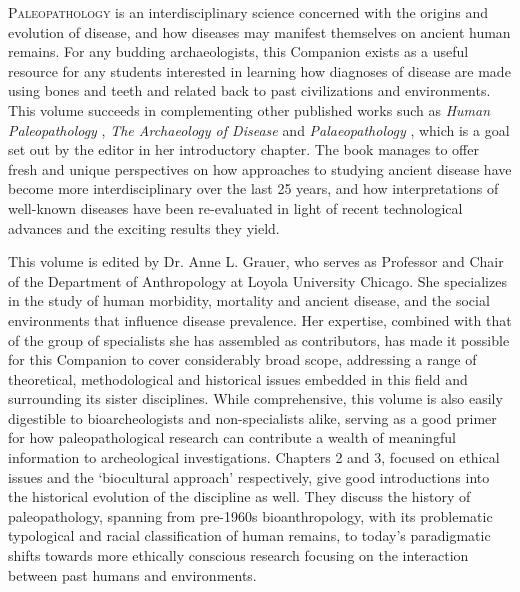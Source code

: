 %
\IJSRAopening%
\lettrine{P}{aleopathology} is an interdisciplinary science concerned with the origins and evolution of disease, and how diseases may manifest themselves on ancient human remains. 
For any budding archaeologists, this Companion exists as a useful resource for any students interested in learning how diagnoses of disease are made using bones and teeth and related back to past civilizations and environments.
This volume succeeds in complementing other published works such as \textit{Human Paleopathology} \parencite{Ortner2003a}, \textit{The Archaeology of Disease} \parencite{Roberts2007} and \textit{Palaeopathology} \parencite{Waldron2009}, which is a goal set out by the editor in her introductory chapter.
The book manages to offer fresh and unique perspectives on how approaches to studying ancient disease have become more interdisciplinary over the last 25 years, and how interpretations of well-known diseases have been re-evaluated in light of recent technological advances and the exciting results they yield.

This volume is edited by Dr. Anne L. Grauer, who serves as Professor and Chair of the Department of Anthropology at Loyola University Chicago.
She specializes in the study of human morbidity, mortality and ancient disease, and the social environments that influence disease prevalence.
Her expertise, combined with that of the group of specialists she has assembled as contributors, has made it possible for this Companion to cover considerably broad scope, addressing a range of theoretical, methodological and historical issues embedded in this field and surrounding its sister disciplines.
While comprehensive, this volume is also easily digestible to bioarcheologists and non-specialists alike, serving as a good primer for how paleopathological research can contribute a wealth of meaningful information to archeological investigations.
Chapters 2 and 3, focused on ethical issues and the ‘biocultural approach’ respectively, give good introductions into the historical evolution of the discipline as well.
They discuss the history of paleopathology, spanning from pre-1960s bioanthropology, with its problematic typological and racial classification of human remains, to today’s paradigmatic shifts towards more ethically conscious research focusing on the interaction between past humans and environments.

